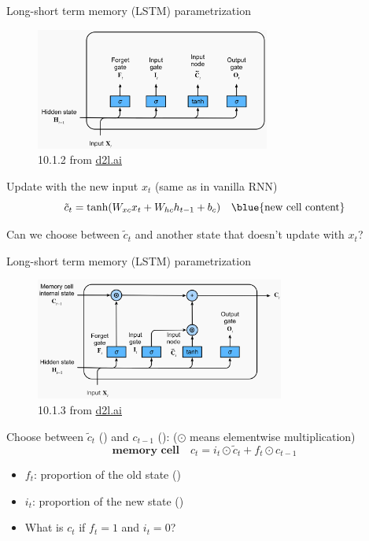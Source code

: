 \documentclass[usenames,dvipsnames,notes,11pt,aspectratio=169,hyperref={colorlinks=true, linkcolor=blue}]{beamer}
\begin{document}
\begin{frame}
    {Long-short term memory (LSTM) parametrization}
    \begin{figure}
        \includegraphics[height=4cm]{figures/lstm-1}
        \caption{10.1.2 from \href{https://d2l.ai/chapter_recurrent-modern/lstm.html}{d2l.ai}}
    \end{figure}

    Update with the new input $x_t$ (same as in vanilla RNN)
    $$
    \tilde{c}_t = \tanh(W_{xc}x_t + W_{hc}h_{t-1} + b_c) \quad \text{\blue{new cell content}}
    $$

    \pause\vspace{-1ex}
    Can we choose between $\tilde{c}_t$ and another state that doesn't update with $x_t$?
\end{frame}

\begin{frame}
    {Long-short term memory (LSTM) parametrization}
    \begin{figure}
        \includegraphics[height=4cm]{figures/lstm-2}
        \caption{10.1.3 from \href{https://d2l.ai/chapter_recurrent-modern/lstm.html}{d2l.ai}}
    \end{figure}
    \vspace{-1em}

    Choose between $\tilde{c}_t$ () and $c_{t-1}$ (): 
    ($\odot$ means elementwise multiplication)
    $$
    \textbf{memory cell} \quad
    c_t = i_t \odot \tilde{c}_t + f_t \odot c_{t-1}
    $$

    \vspace{-1ex}
    \begin{itemize}
        \item $f_t$: proportion of the old state ()
        \item $i_t$: proportion of the new state ()
        \item What is $c_t$ if $f_t=1$ and $i_t=0$?
    \end{itemize}
\end{frame}
\end{document}
